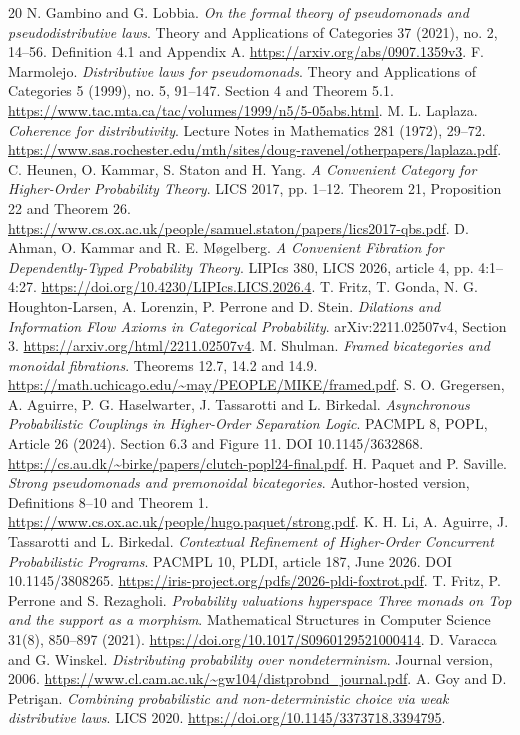 \documentclass[11pt,a4paper]{article}
\theoremstyle{definition}
\begin{document}
\begin{thebibliography}{20}
 N. Gambino and G. Lobbia. \emph{On the formal theory of
pseudomonads and pseudodistributive laws}. Theory and Applications of
Categories 37 (2021), no. 2, 14--56. Definition 4.1 and Appendix A.
\url{https://arxiv.org/abs/0907.1359v3}.
 F. Marmolejo. \emph{Distributive laws for pseudomonads}.
Theory and Applications of Categories 5 (1999), no. 5, 91--147.
Section 4 and Theorem 5.1.
\url{https://www.tac.mta.ca/tac/volumes/1999/n5/5-05abs.html}.
 M. L. Laplaza. \emph{Coherence for distributivity}.
Lecture Notes in Mathematics 281 (1972), 29--72.
\url{https://www.sas.rochester.edu/mth/sites/doug-ravenel/otherpapers/laplaza.pdf}.
 C. Heunen, O. Kammar, S. Staton and H. Yang.
\emph{A Convenient Category for Higher-Order Probability Theory}.
LICS 2017, pp. 1--12. Theorem 21, Proposition 22 and Theorem 26.
\url{https://www.cs.ox.ac.uk/people/samuel.staton/papers/lics2017-qbs.pdf}.
 D. Ahman, O. Kammar and R. E. M\o gelberg.
\emph{A Convenient Fibration for Dependently-Typed Probability Theory}.
LIPIcs 380, LICS 2026, article 4, pp. 4:1--4:27.
\url{https://doi.org/10.4230/LIPIcs.LICS.2026.4}.
 T. Fritz, T. Gonda, N. G. Houghton-Larsen,
A. Lorenzin, P. Perrone and D. Stein.
\emph{Dilations and Information Flow Axioms in Categorical Probability}.
arXiv:2211.02507v4, Section 3.
\url{https://arxiv.org/html/2211.02507v4}.
 M. Shulman. \emph{Framed bicategories and monoidal
fibrations}. Theorems 12.7, 14.2 and 14.9.
\url{https://math.uchicago.edu/~may/PEOPLE/MIKE/framed.pdf}.
 S. O. Gregersen, A. Aguirre, P. G. Haselwarter,
J. Tassarotti and L. Birkedal. \emph{Asynchronous Probabilistic Couplings
in Higher-Order Separation Logic}. PACMPL 8, POPL, Article 26 (2024).
Section 6.3 and Figure 11. DOI 10.1145/3632868.
\url{https://cs.au.dk/~birke/papers/clutch-popl24-final.pdf}.
 H. Paquet and P. Saville.
\emph{Strong pseudomonads and premonoidal bicategories}.
Author-hosted version, Definitions 8--10 and Theorem 1.
\url{https://www.cs.ox.ac.uk/people/hugo.paquet/strong.pdf}.
 K. H. Li, A. Aguirre, J. Tassarotti and L. Birkedal.
\emph{Contextual Refinement of Higher-Order Concurrent Probabilistic Programs}.
PACMPL 10, PLDI, article 187, June 2026. DOI 10.1145/3808265.
\url{https://iris-project.org/pdfs/2026-pldi-foxtrot.pdf}.
 T. Fritz, P. Perrone and S. Rezagholi.
\emph{Probability valuations hyperspace Three monads on Top and the support
as a morphism}. Mathematical Structures in Computer Science 31(8),
850--897 (2021).
\url{https://doi.org/10.1017/S0960129521000414}.
 D. Varacca and G. Winskel.
\emph{Distributing probability over nondeterminism}. Journal version, 2006.
\url{https://www.cl.cam.ac.uk/~gw104/distprobnd_journal.pdf}.
 A. Goy and D. Petri\c{s}an.
\emph{Combining probabilistic and non-deterministic choice via weak
distributive laws}. LICS 2020.
\url{https://doi.org/10.1145/3373718.3394795}.
\end{thebibliography}
\end{document}
